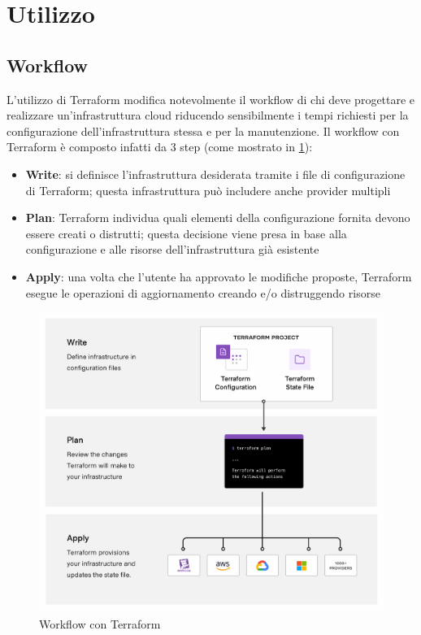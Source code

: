 \section{Utilizzo}

\subsection{Workflow}

L'utilizzo di Terraform modifica notevolmente il workflow di chi deve progettare e realizzare un'infrastruttura cloud riducendo sensibilmente i tempi richiesti per la configurazione dell'infrastruttura stessa e per la manutenzione. Il workflow con Terraform è composto infatti da 3 step (come mostrato in \cref{fig:terraform_workflow}):
\begin{itemize}
    \item \textbf{Write}: si definisce l'infrastruttura desiderata tramite i file di configurazione di Terraform; questa infrastruttura può includere anche provider multipli
    \item \textbf{Plan}: Terraform individua quali elementi della configurazione fornita devono essere creati o distrutti; questa decisione viene presa in base alla configurazione e alle risorse dell'infrastruttura già esistente
    \item \textbf{Apply}: una volta che l'utente ha approvato le modifiche proposte, Terraform esegue le operazioni di aggiornamento creando e/o distruggendo risorse
\end{itemize}

\begin{figure}[H]
    \center
    \includegraphics[scale=0.15]{tesi/files/immagini/terraform/workflow.png}
    \caption{Workflow con Terraform}
    \label{fig:terraform_workflow}
\end{figure}

